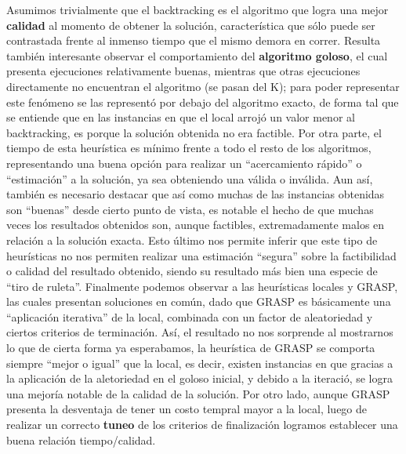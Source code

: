 Asumimos trivialmente que el backtracking es el algoritmo que logra una mejor \textbf{calidad} al momento de obtener la solución, característica que sólo puede ser contrastada frente al inmenso tiempo que el mismo demora en correr. Resulta también interesante observar el comportamiento del \textbf{algoritmo goloso}, el cual presenta ejecuciones relativamente buenas, mientras que otras ejecuciones directamente no encuentran el algoritmo (se pasan del K); para poder representar este fenómeno se las representó por debajo del algoritmo exacto, de forma tal que se entiende que en las instancias en que el local arrojó un valor menor al backtracking, es porque la solución obtenida no era factible. Por otra parte, el tiempo de esta heurística es mínimo frente a todo el resto de los algoritmos, representando una buena opción para realizar un ``acercamiento rápido'' o ``estimación'' a la solución, ya sea obteniendo una válida o inválida. Aun así, también es necesario destacar que así como muchas de las instancias obtenidas son ``buenas'' desde cierto punto de vista, es notable el hecho de que muchas veces los resultados obtenidos son, aunque factibles, extremadamente malos en relación a la solución exacta. Esto último nos permite inferir que este tipo de heurísticas no nos permiten realizar una estimación ``segura'' sobre la factibilidad o calidad del resultado obtenido, siendo su resultado más bien una especie de ``tiro de ruleta''. Finalmente podemos observar a las heurísticas locales y GRASP, las cuales presentan soluciones en común, dado que GRASP es básicamente una ``aplicación iterativa'' de la local, combinada con un factor de aleatoriedad y ciertos criterios de terminación. Así, el resultado no nos sorprende al mostrarnos lo que de cierta forma ya esperabamos, la heurística de GRASP se comporta siempre ``mejor o igual'' que la local, es decir, existen instancias en que gracias a la aplicación de la aletoriedad en el goloso inicial, y debido a la iteració, se logra una mejoría notable de la calidad de la solución. Por otro lado, aunque GRASP presenta la desventaja de tener un costo tempral mayor a la local, luego de realizar un correcto \textbf{tuneo} de los criterios de finalización logramos establecer una buena relación tiempo/calidad.
